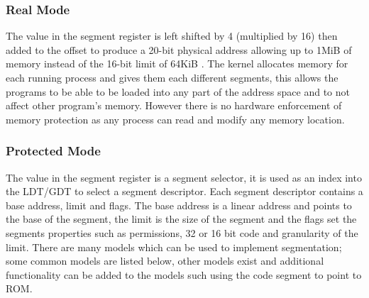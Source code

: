 \documentclass{article}
\newcommand{\layout}[1]{\parbox{\linewidth}{#1}}
\begin{document}
\layout{
  \subsubsection{Real Mode}

  The value in the segment register is left shifted by 4 (multiplied by 16) then added to the offset to produce a 20-bit physical address allowing up to 1MiB of memory instead of the 16-bit limit of 64KiB \cite[Chapter~22.1.1]{sdm3}.
  The kernel allocates memory for each running process and gives them each different segments, this allows the programs to be able to be loaded into any part of the address space and to not affect other program's memory.
  However there is no hardware enforcement of memory protection as any process can read and modify any memory location.
}

\layout{
  \subsubsection{Protected Mode}

  The value in the segment register is a segment selector, it is used as an index into the LDT/GDT to select a segment descriptor.
  Each segment descriptor contains a base address, limit and flags.
  The base address is a linear address and points to the base of the segment, the limit is the size of the segment and the flags set the segments properties such as permissions, 32 or 16 bit code and granularity of the limit.
  There are many models which can be used to implement segmentation; some common models are listed below, other models exist and additional functionality can be added to the models such using the code segment to point to ROM.

  \bigskip \cite[Chapter~3.1]{sdm3}
}
\end{document}
